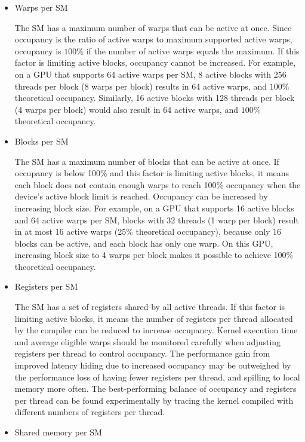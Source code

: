 \documentclass[oneside,openright,12pt,final,en]{mgr}
\begin{document}
\begin{itemize}
	\item Warps per SM
		
	The SM has a maximum number of warps that can be active at once. Since occupancy is the ratio of active warps to maximum supported active warps, occupancy is $100\%$ if the number of active warps equals the maximum. If this factor is limiting active blocks, occupancy cannot be increased. For example, on a GPU that supports 64 active warps per SM, 8 active blocks with 256 threads per block (8 warps per block) results in 64 active warps, and $100\%$ theoretical occupancy. Similarly, 16 active blocks with 128 threads per block (4 warps per block) would also result in 64 active warps, and $100\%$ theoretical occupancy.	
	
	\item Blocks per SM
	
	The SM has a maximum number of blocks that can be active at once. If occupancy is below 100\% and this factor is limiting active blocks, it means each block does not contain enough warps to reach 100\% occupancy when the device's active block limit is reached. Occupancy can be increased by increasing block size. For example, on a GPU that supports 16 active blocks and 64 active warps per SM, blocks with 32 threads (1 warp per block) result in at most 16 active warps (25\% theoretical occupancy), because only 16 blocks can be active, and each block has only one warp. On this GPU, increasing block size to 4 warps per block makes it possible to achieve 100\% theoretical occupancy.
	
	\item Registers per SM
	
	The SM has a set of registers shared by all active threads. If this factor is limiting active blocks, it means the number of registers per thread allocated by the compiler can be reduced to increase occupancy. Kernel execution time and average eligible warps should be monitored carefully when adjusting registers per thread to control occupancy. The performance gain from improved latency hiding due to increased occupancy may be outweighed by the performance loss of having fewer registers per thread, and spilling to local memory more often. The best-performing balance of occupancy and registers per thread can be found experimentally by tracing the kernel compiled with different numbers of registers per thread.
	
	\item Shared memory per SM
	

\end{itemize}
\end{document}
